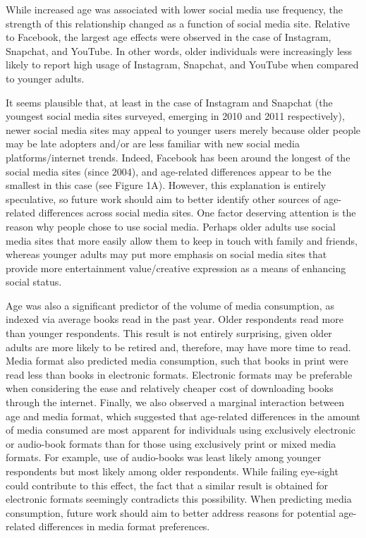 \documentclass[man, fleqn, noextraspace]{apa6}
\theoremstyle{definition}
\theoremstyle{definition}
\theoremstyle{definition}
\theoremstyle{remark}
\begin{document}
While increased age was associated with lower social media use
frequency, the strength of this relationship changed as a function of
social media site. Relative to Facebook, the largest age effects were
observed in the case of Instagram, Snapchat, and YouTube. In other
words, older individuals were increasingly less likely to report high
usage of Instagram, Snapchat, and YouTube when compared to younger
adults.

It seems plausible that, at least in the case of Instagram and Snapchat
(the youngest social media sites surveyed, emerging in 2010 and 2011
respectively), newer social media sites may appeal to younger users
merely because older people may be late adopters and/or are less
familiar with new social media platforms/internet trends. Indeed,
Facebook has been around the longest of the social media sites (since
2004), and age-related differences appear to be the smallest in this
case (see Figure 1A). However, this explanation is entirely speculative,
so future work should aim to better identify other sources of
age-related differences across social media sites. One factor deserving
attention is the reason why people chose to use social media. Perhaps
older adults use social media sites that more easily allow them to keep
in touch with family and friends, whereas younger adults may put more
emphasis on social media sites that provide more entertainment
value/creative expression as a means of enhancing social status.

Age was also a significant predictor of the volume of media consumption,
as indexed via average books read in the past year. Older respondents
read more than younger respondents. This result is not entirely
surprising, given older adults are more likely to be retired and,
therefore, may have more time to read. Media format also predicted media
consumption, such that books in print were read less than books in
electronic formats. Electronic formats may be preferable when
considering the ease and relatively cheaper cost of downloading books
through the internet. Finally, we also observed a marginal interaction
between age and media format, which suggested that age-related
differences in the amount of media consumed are most apparent for
individuals using exclusively electronic or audio-book formats than for
those using exclusively print or mixed media formats. For example, use
of audio-books was least likely among younger respondents but most
likely among older respondents. While failing eye-sight could contribute
to this effect, the fact that a similar result is obtained for
electronic formats seemingly contradicts this possibility. When
predicting media consumption, future work should aim to better address
reasons for potential age-related differences in media format
preferences.
\end{document}
